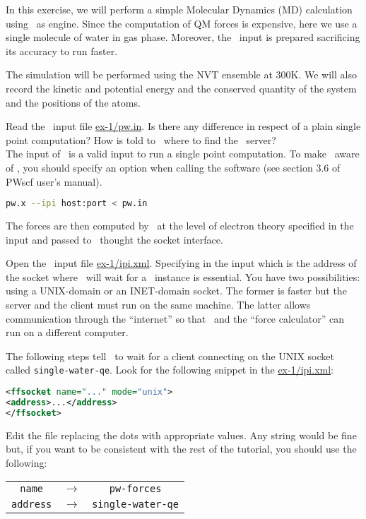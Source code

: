 \documentclass{article}
\begin{document}
\begin{Exercise}[label={i-pi},title={Molecular Dynamics: a client/server approach}]

In this exercise, we will perform a simple Molecular Dynamics (MD)
calculation using \PWscf\ as engine. Since the computation of QM forces is
expensive, here we use a single molecule of water in gas phase. Moreover, the
\PWscf\ input is prepared sacrificing its accuracy to run faster.

The simulation will be performed using the NVT ensemble at 300K.  We
will also record the kinetic and potential energy and the conserved
quantity of the system and the positions of the atoms.

\Question
Read the \PWscf\ input file \url{ex-1/pw.in}.
Is there any difference in respect of a plain single point computation?
How is told to \pwx\ where to find the \ipi\ server?\\

The input of \pwx\ is a valid input to run a single point
computation. To make \pwx\ aware of \ipi, you should specify an option
when calling the software (see section 3.6 of PWscf user's manual).
\begin{lstlisting}[language=bash]
pw.x --ipi host:port < pw.in
\end{lstlisting}
The forces are then computed by \pwx\ at the level of electron theory
specified in the input and passed to \ipi\ thought the socket
interface.

\Question
Open the \ipi\ input file \url{ex-1/ipi.xml}. Specifying in
the input which is the address of the socket where \ipi\ will wait for a \pwx\
instance is essential. You have two possibilities: using a UNIX-domain
or an INET-domain socket. The former is faster but the server and the
client must run on the same machine. The latter allows communication
through the ``internet'' so that \ipi\ and the ``force
calculator'' can run on a different computer.

The following steps tell \ipi\ to wait for a client connecting on the UNIX
socket called \texttt{single-water-qe}. Look for the following snippet
in the \url{ex-1/ipi.xml}:
\begin{lstlisting}[language=xml]
<ffsocket name="..." mode="unix">
<address>...</address>
</ffsocket>
\end{lstlisting}
Edit the file replacing the dots with appropriate values. Any string
would be fine but, if you
want to be consistent with the rest of the tutorial, you should use
the following:
\begin{table}[h!]
  \centering
  \begin{tabular}{ccc}
    \texttt{name} & $\longrightarrow$ & \texttt{pw-forces}\\
    \texttt{address} & $\longrightarrow$ & \texttt{single-water-qe}
  \end{tabular}
\end{table}



\end{Exercise}
\end{document}
